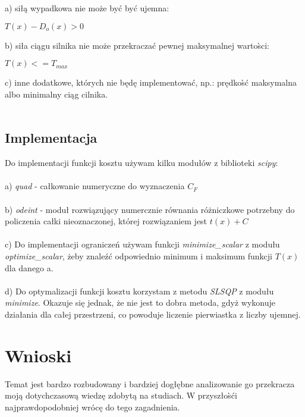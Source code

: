 \documentclass[12pt, letterpaper, twoside]{article}
\begin{document}
a) siłą wypadkowa nie może być być ujemna: \\
\begin{center}
\(T(x) - D_o(x) > 0\)
\end{center}
b) siła ciągu silnika nie może przekraczać pewnej maksymalnej warto{{\`s}}ci: \\
\begin{center}
\(T(x) <= T_{max}\)
\end{center}
c) inne dodatkowe, których nie będę implementować, np.: prędko{{\`s}}ć maksymalna albo minimalny ciąg cilnika. \\\\
\begin{center}
\section*{Implementacja}
\end{center}
Do implementacji funkcji kosztu używam kilku modułów z biblioteki \emph{scipy}:\\\\
a)  \emph{quad} - całkowanie numeryczne do wyznaczenia \(C_F\)\\\\
b)  \emph{odeint} - moduł rozwiązujący numercznie równania różniczkowe potrzebny do policzenia całki nieoznaczonej, której rozwiązaniem jest \(  t(x) + C \) \\\\
c) Do implementacji ograniczeń używam funkcji \emph{minimize\_scalar} z modułu \emph{optimize\_scalar}, żeby znaleźć odpowiednio minimum i maksimum funkcji \(T(x) \) dla danego a.\\\\
d) Do optymalizacji funkcji kosztu korzystam z metodu \emph{SLSQP} z modułu \emph{minimize}.
Okazuje się jednak, że nie jest to dobra metoda, gdyż wykonuje działania dla całej przestrzeni, co powoduje liczenie pierwiastka z liczby ujemnej.\\
\pagebreak
\section*{Wnioski}
Temat jest bardzo rozbudowany i bardziej dogłębne analizowanie go przekracza moją dotychczasową wiedzę zdobytą na studiach. W przyszło{{\`s}}ći najprawdopodobniej wrócę do tego zagadnienia.
\end{document}
